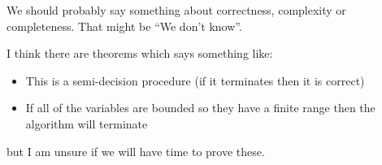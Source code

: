 
We should probably say something about correctness, complexity or completeness.
That might be ``We don't know''. 

I think there are theorems which says something like:
\begin{itemize}
\item{This is a semi-decision procedure (if it terminates then it is correct)}
\item{If all of the variables are bounded so they have a finite range
  then the algorithm will terminate}
\end{itemize}
but I am unsure if we will have time to prove these.
